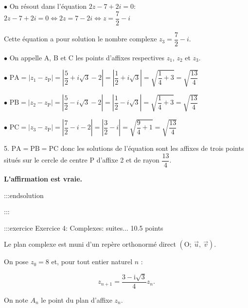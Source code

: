 \documentclass{cornouaille}
\begin{document}
$\bullet$  On résout dans  l'équation $2z-7+2i=0$:
$2z-7+2i=0 \iff 2z=7-2i \iff z = \dfrac{7}{2} - i$

Cette équation a pour solution le nombre complexe $z_3=\dfrac{7}{2}- i$.



$\bullet$  On appelle  A, B et C les points d'affixes respectives $z_1$, $z_2$ et $z_3$.







$\bullet$  $\mathrm{PA} = \left |  z_1 - z_{\mathrm{P}} \right | = \left | \dfrac{5}{2} + i\sqrt{3} -2 \right | = \left |  \dfrac{1}{2} +i\sqrt{3} \right | = \displaystyle\sqrt{\dfrac{1}{4} + 3} = \sqrt{\dfrac{13}{4}}$


$\bullet$  $\mathrm{PB} = \left |z_2 - z_{\mathrm{P}} \right | = \left |\dfrac{5}{2} - i\sqrt{3}-2 \right | = \left |  \dfrac{1}{2} - i\sqrt{3} \right | = \sqrt{\dfrac{1}{4} + 3} = \sqrt{\dfrac{13}{4}}$


$\bullet$  $\mathrm{PC} = \left | z_3 - z_{\mathrm{P}} \right | = \left |\dfrac{7}{2} - i -2 \right | = \left | \dfrac{3}{2} - i \right | = \sqrt{\dfrac{9}{4} + 1} = \sqrt{\dfrac{13}{4}}$







5.  $\mathrm{PA} = \mathrm{PB} = \mathrm{PC}$ donc les solutions de l'équation sont les affixes de trois points situés sur le cercle de centre P d'affixe 2 et de rayon $\dfrac{13}{4}$.





\textbf{L'affirmation est vraie.}


:::endsolution




:::






:::exercice Exercice 4: Complexes: suites... 10.5 points


Le plan complexe est muni d'un repère orthonormé direct $\left(\text{O};~\overrightarrow{u},~\overrightarrow{v}\right)$.

On pose $z_0 = 8$ et, pour tout entier naturel $n$ :


$$
z_{n+1} = \dfrac{3 - \text{i}\sqrt{3}}{4}z_n.
$$


On note $A_n$ le point du plan d'affixe $z_n$.

\medskip
\end{document}
